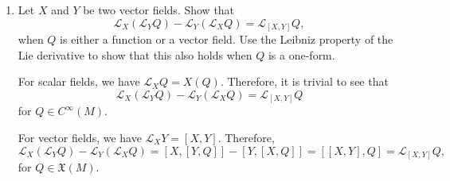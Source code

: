\begin{enumerate}[label=\roman*)]
    \item Let $X$ and $Y$ be two vector fields. Show that
    \begin{equation}
        \mathcal{L}_X(\mathcal{L}_Y Q) - \mathcal{L}_Y(\mathcal{L}_X Q) = \mathcal{L}_{[X,Y]}Q,
    \end{equation}
    when $Q$ is either a function or a vector field. Use the Leibniz property of the Lie derivative to show that this also holds when $Q$ is a one-form.
    \begin{solution}
        For scalar fields, we have $\mathcal{L}_XQ = X(Q)$. Therefore, it is trivial to see that
        \begin{equation}
            \mathcal{L}_X(\mathcal{L}_Y Q) - \mathcal{L}_Y(\mathcal{L}_X Q) = \mathcal{L}_{[X,Y]}Q
        \end{equation}
        for $Q \in C^\infty(M)$.

        For vector fields, we have $\mathcal{L}_XY = [X,Y]$. Therefore, 
        \begin{equation}
            \mathcal{L}_X(\mathcal{L}_Y Q) - \mathcal{L}_Y(\mathcal{L}_X Q) = [X,[Y,Q]] - [Y,[X,Q]] = [[X,Y],Q] = \mathcal{L}_{[X,Y]}Q,
        \end{equation}
        for $Q \in \mathfrak{X}(M)$.


\end{solution}
\end{enumerate}
